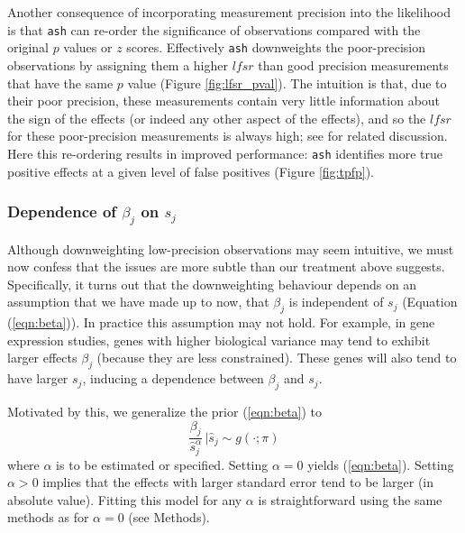 \documentclass[11pt]{article}
\def\lfsr{\textit{lfsr}}
\def\shat{\hat{s}}
\def\ash{{\tt ash}\xspace}
\begin{document}
Another consequence of incorporating measurement precision into the likelihood
is that \ash can re-order the significance of observations compared
 with the original $p$ values or $z$ scores. Effectively \ash downweights the poor-precision 
 observations  by assigning them a higher $\lfsr$ than 
 good precision measurements that have the same $p$ value
 (Figure \ref{fig:lfsr_pval}). 
 The intuition is that, due to their poor precision, these measurements contain very little information about the sign of the effects (or indeed any other aspect of the effects),
 and so the $\lfsr$ for these poor-precision measurements is always high; see \cite{guan.stephens.08} for related discussion. Here this re-ordering results in improved performance: \ash identifies more true positive effects at a given level of false positives (Figure \ref{fig:tpfp}).


 \subsubsection*{Dependence of $\beta_j$ on $s_j$}

 Although downweighting low-precision observations may seem intuitive, we must now
 confess that the issues are more subtle than our treatment above suggests. 
 Specifically, it turns out that the downweighting behaviour depends on an assumption 
that we have made up to now, that $\beta_j$ is independent
of $s_j$ (Equation (\ref{eqn:beta})). In practice this assumption may not hold. 
For example, in gene expression studies, 
genes with higher biological variance may tend to exhibit larger effects $\beta_j$ (because they are
less constrained). These genes will also tend to have larger $s_j$, 
inducing a dependence between $\beta_j$ and $s_j$.

Motivated by this, we generalize the prior (\ref{eqn:beta}) to
 \begin{equation} \label{eqn:beta-alpha}
 \frac{\beta_j}{\shat_j^\alpha} \, \big |  \shat_j \sim g(\cdot; \pi)
 \end{equation}
where $\alpha$ is to be estimated or specified. 
Setting $\alpha=0$ yields (\ref{eqn:beta}). Setting $\alpha>0$ implies that 
the effects with larger standard error tend to be larger (in absolute value).
Fitting this model for any $\alpha$ is straightforward using the same methods as for $\alpha=0$ (see Methods).
\end{document}
